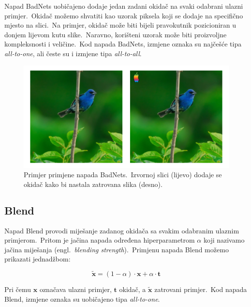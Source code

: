 \documentclass[diplomskirad]{fer}
\begin{document}
Napad BadNets uobičajeno dodaje jedan zadani okidač na svaki odabrani ulazni primjer.\ Okidač možemo shvatiti kao uzorak piksela koji se dodaje na specifično mjesto na slici.\ 
Na primjer, okidač može biti bijeli pravokutnik pozicioniran u donjem lijevom kutu slike.\ Naravno, korišteni uzorak može biti proizvoljne kompleksnosti i veličine.\ 
Kod napada BadNets, izmjene oznaka su najčešće tipa \textit{all-to-one}, ali česte su i izmjene tipa \textit{all-to-all}.\

\begin{figure}[h]
  \centering
  \includegraphics[scale=0.6]{./Slike/imagenet1k_uzorak_badnets.png}
  \caption{Primjer primjene napada BadNets.\ Izvornoj slici (lijevo) dodaje se okidač kako bi nastala zatrovana slika (desno).}
  \label{fig:badnets}
\end{figure}

\pagebreak
  
\subsection{Blend}
\label{sub:blend}

Napad Blend provodi miješanje zadanog okidača sa svakim odabranim ulaznim primjerom.\ Pritom je jačina napada određena hiperparametrom $\alpha$ koji nazivamo jačina miješanja (engl.\ \textit{blending strength}).\ 
Primjenu napada Blend možemo prikazati jednadžbom:

\begin{equation}
  \bm{\tilde{x}} = (1 - \alpha) \cdot \bm{x} + \alpha \cdot \bm{t}
  \label{eq:blend}
\end{equation}

Pri čemu $\bm{x}$ označava ulazni primjer, $\bm{t}$ okidač, a $\bm{\tilde{x}}$ zatrovani primjer.\ Kod napada Blend, izmjene oznaka su uobičajeno tipa \textit{all-to-one}.\
\end{document}
